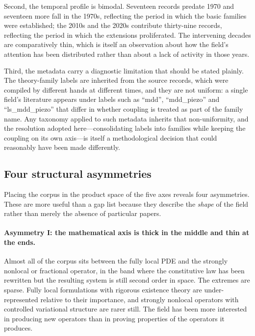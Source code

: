 Second, the temporal profile is bimodal. Seventeen records predate 1970 and seventeen more fall in the 1970s, reflecting the period in which the basic families were established; the 2010s and the 2020s contribute thirty-nine records, reflecting the period in which the extensions proliferated. The intervening decades are comparatively thin, which is itself an observation about how the field's attention has been distributed rather than about a lack of activity in those years.

Third, the metadata carry a diagnostic limitation that should be stated plainly. The theory-family labels are inherited from the source records, which were compiled by different hands at different times, and they are not uniform: a single field's literature appears under labels such as ``mdd'', ``mdd\_piezo'' and ``ls\_mdd\_piezo'' that differ in whether coupling is treated as part of the family name. Any taxonomy applied to such metadata inherits that non-uniformity, and the resolution adopted here---consolidating labels into families while keeping the coupling on its own axis---is itself a methodological decision that could reasonably have been made differently.

\subsection{Four structural asymmetries}
\label{sec:14.4}

Placing the corpus in the product space of the five axes reveals four asymmetries. These are more useful than a gap list because they describe the \emph{shape} of the field rather than merely the absence of particular papers.

\paragraph{Asymmetry I: the mathematical axis is thick in the middle and thin at the ends.}
Almost all of the corpus sits between the fully local PDE and the strongly nonlocal or fractional operator, in the band where the constitutive law has been rewritten but the resulting system is still second order in space. The extremes are sparse. Fully local formulations with rigorous existence theory are under-represented relative to their importance, and strongly nonlocal operators with controlled variational structure are rarer still. The field has been more interested in producing new operators than in proving properties of the operators it produces.

